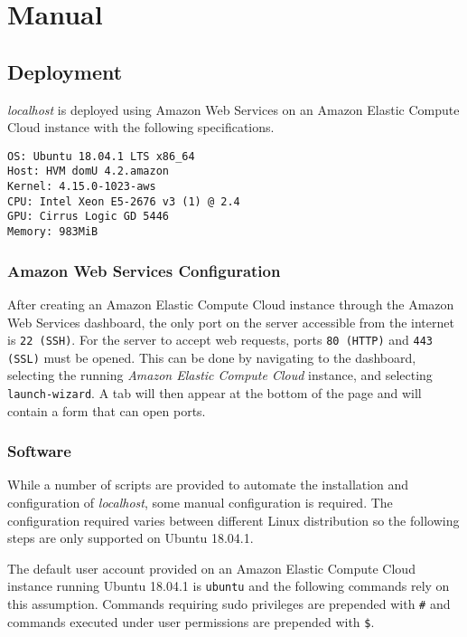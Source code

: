 \section{Manual}

\subsection{Deployment}

\emph{localhost} is deployed using Amazon Web Services on an Amazon Elastic
Compute Cloud instance with the following specifications.
\begin{lstlisting}
OS: Ubuntu 18.04.1 LTS x86_64
Host: HVM domU 4.2.amazon
Kernel: 4.15.0-1023-aws
CPU: Intel Xeon E5-2676 v3 (1) @ 2.4
GPU: Cirrus Logic GD 5446
Memory: 983MiB
\end{lstlisting}

\subsubsection{Amazon Web Services Configuration}

After creating an Amazon Elastic Compute Cloud instance through the Amazon Web
Services dashboard, the only port on the server accessible from the internet
is \lstinline{22 (SSH)}. For the server to accept web requests, ports
\lstinline{80 (HTTP)} and \lstinline{443 (SSL)} must be opened. This can be
done by navigating to the dashboard, selecting the running
\emph{Amazon Elastic Compute Cloud} instance, and selecting
\lstinline{launch-wizard}. A tab will then appear at the bottom of the page
and will contain a form that can open ports.

\subsubsection{Software}

While a number of scripts are provided to automate the installation and
configuration of \emph{localhost}, some manual configuration is required.
The configuration required varies between different Linux distribution so the
following steps are only supported on Ubuntu 18.04.1.

The default user account provided on an Amazon Elastic Compute Cloud instance
running Ubuntu 18.04.1 is \lstinline{ubuntu} and the following commands rely on
this assumption. Commands requiring sudo privileges are prepended with
\lstinline{#} and commands executed under user permissions are prepended with
\lstinline{$}.

